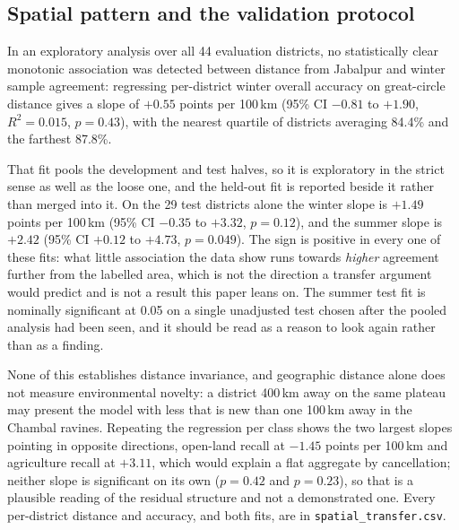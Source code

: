 \documentclass[conference]{IEEEtran}
\begin{document}
\subsection{Spatial pattern and the validation protocol}
\label{sec:spatial}
In an exploratory analysis over all 44 evaluation districts, no statistically clear monotonic association was detected between distance from Jabalpur and winter sample agreement: regressing per-district winter overall accuracy on great-circle distance gives a slope of $+0.55$ points per 100\,km (95\% CI $-0.81$ to $+1.90$, $R^2=0.015$, $p=0.43$), with the nearest quartile of districts averaging 84.4\% and the farthest 87.8\%.

That fit pools the development and test halves, so it is exploratory in the strict sense as well as the loose one, and the held-out fit is reported beside it rather than merged into it. On the 29 test districts alone the winter slope is $+1.49$ points per 100\,km (95\% CI $-0.35$ to $+3.32$, $p=0.12$), and the summer slope is $+2.42$ (95\% CI $+0.12$ to $+4.73$, $p=0.049$). The sign is positive in every one of these fits: what little association the data show runs towards \emph{higher} agreement further from the labelled area, which is not the direction a transfer argument would predict and is not a result this paper leans on. The summer test fit is nominally significant at 0.05 on a single unadjusted test chosen after the pooled analysis had been seen, and it should be read as a reason to look again rather than as a finding.

None of this establishes distance invariance, and geographic distance alone does not measure environmental novelty: a district 400\,km away on the same plateau may present the model with less that is new than one 100\,km away in the Chambal ravines. Repeating the regression per class shows the two largest slopes pointing in opposite directions, open-land recall at $-1.45$ points per 100\,km and agriculture recall at $+3.11$, which would explain a flat aggregate by cancellation; neither slope is significant on its own ($p=0.42$ and $p=0.23$), so that is a plausible reading of the residual structure and not a demonstrated one. Every per-district distance and accuracy, and both fits, are in \texttt{spatial\_transfer.csv}.
\end{document}
